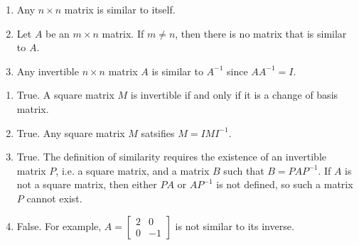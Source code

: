 \begin{exercises}
\begin{problist}
\begin{enumerate}
			\item Any $n \times n$ matrix is similar to itself.

			\item Let $A$ be an $m \times n$ matrix. If $m
				\neq n$, then there is no matrix that is
				similar to $A$.

			\item Any invertible $n \times n$ matrix $A$ is similar to
				$A^{-1}$ since $AA^{-1}=I$.
		\end{enumerate}
		\begin{solution}
			\begin{enumerate}
				\item True. A square matrix $M$ is invertible if and only if it is a change of basis matrix.
				\item True. Any square matrix $M$ satsifies $M=IMI^{-1}$.
				\item True. The definition of similarity requires the existence of an invertible matrix $P$,
					i.e. a square matrix, and a matrix $B$ such that $B=PAP^{-1}$. If $A$ is not a square matrix,
					then either $PA$ or $AP^{-1}$ is not defined, so such a matrix $P$ cannot exist.
				\item False. For example, 
				$A=\begin{bmatrix}
					2 & 0 \\ 0 & -1
				\end{bmatrix}$
				is not similar to its inverse.
			\end{enumerate}
		\end{solution}
	\end{problist}
\end{exercises}
